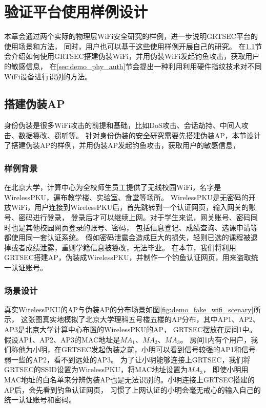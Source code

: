 
\chapter{验证平台使用样例设计}
	本章会通过两个实际的物理层WiFi安全研究的样例，进一步说明GRTSEC平台的使用场景和方法，
	同时，用户也可以基于这些使用样例开展自己的研究。
	在\ref{sec:demo_fake_wifi}节会介绍如何使用GRTSEC搭建伪装WiFi，并用伪装WiFi发起钓鱼攻击，获取用户的敏感信息，
	在\ref{sec:demo_phy_auth}节会提出一种利用利用硬件指纹技术对不同WiFi设备进行识别的方法。

	\section{搭建伪装AP}\label{sec:demo_fake_wifi}
	身份伪装是很多WiFi攻击的前提和基础，比如DoS攻击、会话劫持、中间人攻击、数据篡改、窃听等\cite{ieeewc10}。
	针对身份伪装的安全研究需要先搭建伪装AP，本节设计了搭建伪装AP的样例，并用伪装AP发起钓鱼攻击，获取用户的敏感信息，

		\subsection{样例背景}
		在北京大学，计算中心为全校师生员工提供了无线校园WiFi，名字是WirelessPKU，遍布教学楼、实验室、食堂等场所。
		WirelessPKU是无密码的开放WiFi，用户连接到WirelessPKU后，首先跳转到一个认证网页，输入网关的账号、密码进行登录，
		登录后才可以继续上网。对于学生来说，网关账号、密码同时也是其他校园网页登录的账号、密码，
		包括信息登记、成绩查询、选课申请等都使用同一套认证系统。
		假如密码泄露会造成巨大的损失，轻则已选的课程被退掉或者成绩泄露，重则学籍信息被篡改，无法毕业。
		在本节，我们将利用GRTSEC搭建AP，伪装成WirelessPKU，并制作一个钓鱼认证网页，用来盗取统一认证账号。

		\subsection{场景设计}
		真实WirelessPKU的AP与伪装AP的分布场景如图\ref{fig:demo_fake_wifi_scenary}所示，
		这张图真实地模拟了北京大学理科五号楼五楼的AP分布，其中AP1、AP2、AP3是北京大学计算中心布置的WirelessPKU的AP，
		GRTSEC摆放在房间1中。假设AP1、AP2、AP3的MAC地址是$MA_1$、$MA_2$、$MA_3$。
		房间1内有个用户，我们称他为小明，在GRTSEC发起伪装之前，小明可以看到信号较强的AP1和信号弱一些的AP2，看不到远处的AP3。
		为了让小明能够连接上GRTSEC，我们将GRTSEC的SSID设置为WirelessPKU，将MAC地址设置为$MA_3$，
		即使小明用MAC地址的白名单来分辨伪装AP也是无法识别的。小明连接上GRTSEC搭建的AP后，会先看到钓鱼认证网页，
		习惯了上网认证的小明会毫无戒心的输入自己的统一认证账号和密码。

